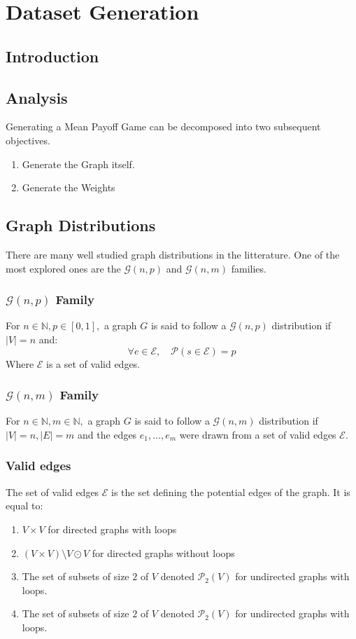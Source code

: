 \chapter{Dataset Generation}

\section{Introduction}
\section{Analysis}
Generating a Mean Payoff Game can be decomposed into two subsequent objectives.
\begin{enumerate}
	\item Generate the Graph itself.
	\item Generate the Weights
\end{enumerate}


\section{Graph Distributions}
There are many well studied graph distributions in the litterature. \newline
One of the most explored ones are the $\mathcal{G}(n,p)$ and $\mathcal{G}(n,m)$ families.
\subsection{$\mathcal{G}(n,p)$ Family}
For $n\in\mathbb{N},p\in[0,1],$ a graph $G$ is said to follow a $\mathcal{G}(n,p)$ distribution if $\lvert V \rvert=n$ and:
$$
\forall e\in \mathscr{E}, \quad \mathscr{P}(s\in \mathcal{E})=p
$$
Where $\mathscr{E}$ is a set of valid edges. 

\subsection{$\mathcal{G}(n,m)$ Family}
For $n\in\mathbb{N},m\in\mathbb{N},$ a graph $G$ is said to follow a $\mathcal{G}(n,m)$ distribution if $\lvert V \rvert=n,\lvert  E \rvert=m$ and the edges $e_1,\dots,e_m$ were drawn from a set of valid edges $\mathscr{E}.$
\subsection{Valid edges}
The set of valid edges $\mathscr{E}$ is the set defining the potential edges of the graph. It is equal to:
\begin{enumerate}
	\item $V\times V$ for directed graphs with loops 
	\item $(V\times V)\setminus V\odot V$ for directed graphs without loops
	\item The set of subsets of size $2$ of $V$ denoted $\mathscr{P}_2(V)$ for undirected graphs with loops.
	\item The set of subsets of size $2$ of $V$ denoted $\mathscr{P}_2(V)$ for undirected graphs with loops.
\end{enumerate}

